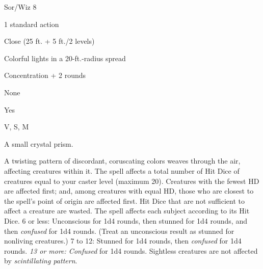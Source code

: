 
\begin{description*}
\item[Level:] Sor/Wiz 8
\item[Casting Time:] 1 standard action
\item[Range:] Close (25 ft. + 5 ft./2 levels)
\item[Effect:] Colorful lights in a 20-ft.-radius spread
\item[Duration:] Concentration + 2 rounds
\item[Saving Throw:] None
\item[Spell Resistance:] Yes
\item[Components:] V, S, M
\item[Arcane Material Component:] A small crystal prism.
\end{description*}

A twisting pattern of discordant, coruscating colors weaves through the air, affecting
creatures within it. The spell affects a total number of Hit Dice of creatures
equal to your caster level (maximum 20). Creatures with the fewest HD are affected
first; and, among creatures with equal HD, those who are closest to the spell's
point of origin are affected first. Hit Dice that are not sufficient to affect
a creature are wasted. The spell affects each subject according to its Hit Dice.
6 or less: Unconscious for 1d4 rounds, then stunned for 1d4 rounds, and
then \textit{confused} for 1d4 rounds. (Treat an unconscious result as stunned
for nonliving creatures.)
7 to 12: Stunned for 1d4 rounds, then \textit{confused} for 1d4 rounds.
\textit{13 or more: Confused} for 1d4 rounds.
Sightless creatures are not affected by \textit{scintillating pattern}.